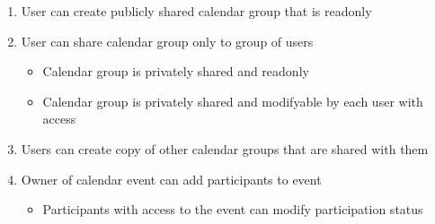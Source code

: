 \begin{enumerate}[label=\color{reqcolor}\textbf{R{\arabic*}}, resume]
    \item \label{app:req:sharing1} User can create publicly shared calendar group that is readonly
    \item \label{app:req:sharing2} User can share calendar group only to group of users    
        \begin{itemize}
            \item Calendar group is privately shared and readonly
            \item Calendar group is privately shared and modifyable by each user with access
        \end{itemize}
    \item \label{app:req:sharing3} Users can create copy of other calendar groups that are shared with them
    \item \label{app:req:sharing4} Owner of calendar event can add participants to event
        \begin{itemize}
            \item Participants with access to the event can modify participation status
        \end{itemize}
\end{enumerate}

